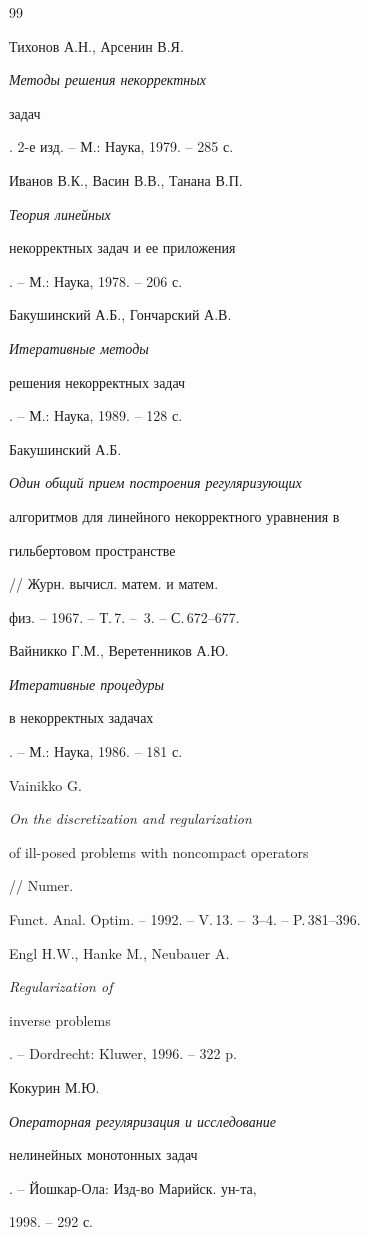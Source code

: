 \begin{thebibliography}{99} 


 




Тихонов А.Н., Арсенин В.Я. {\em Методы решения некорректных 


задач}. 2-е изд. -- М.: Наука, 1979. -- 285 с. 




Иванов В.К., Васин В.В., Танана В.П. {\em Теория линейных 


некорректных задач и ее приложения}. -- М.: Наука, 1978. -- 206 с. 




Бакушинский А.Б., Гончарский А.В. {\em Итеративные методы 


решения некорректных задач}. -- М.: Наука, 1989. -- 128 с. 




Бакушинский А.Б. {\em Один общий прием построения регуляризующих 


алгоритмов для линейного некорректного уравнения в 


гильбертовом пространстве} // Журн. вычисл. матем. и матем. 


физ. -- 1967. -- Т.\,7. -- \No\,3. -- С.\,672--677. 




Вайникко Г.М., Веретенников А.Ю. {\em Итеративные процедуры 


в некорректных задачах}. -- М.: Наука, 1986. -- 181 с. 




Vainikko G. {\em On the discretization and regularization 


of ill-posed problems with noncompact operators} // Numer. 


Funct. Anal. Optim. -- 1992. -- V.\,13. -- \No\,3--4. -- P.\,381--396. 




Engl H.W., Hanke M., Neubauer A. {\em Regularization of 


inverse problems}. -- Dordrecht: Kluwer, 1996. -- 322 p. 




Кокурин М.Ю. {\em Операторная регуляризация и исследование 


нелинейных монотонных задач}. -- Йошкар-Ола: Изд-во Марийск. ун-та, 


1998. -- 292 с. 



\end{thebibliography}
